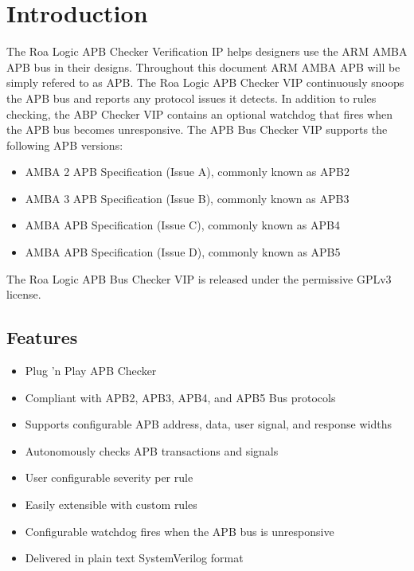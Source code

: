 \chapter{Introduction} \label{introduction}

The Roa Logic APB Checker Verification IP helps designers use the ARM\textsuperscript{\textregistered}  AMBA\textsuperscript{\textregistered}  APB\textsuperscript{\cite{ArmAPB}} bus in their designs. Throughout this document ARM\textsuperscript{\textregistered}  AMBA\textsuperscript{\textregistered}  APB will be simply refered to as APB.
The Roa Logic APB Checker VIP continuously snoops the APB bus and reports any protocol issues it detects.
In addition to rules checking, the ABP Checker VIP contains an optional watchdog that fires when the APB bus becomes unresponsive.
The APB Bus Checker VIP supports the following APB versions:
\begin{itemize}
\item
  AMBA 2 APB Specification (Issue A), commonly known as APB2
\item
  AMBA 3 APB Specification (Issue B), commonly known as APB3
\item
  AMBA APB Specification (Issue C), commonly known as APB4
\item
  AMBA APB Specification (Issue D), commonly known as APB5
\end{itemize}

The Roa Logic APB Bus Checker VIP is released under the permissive GPLv3 license.


\section{Features}\label{features}

\begin{itemize}
\item
  Plug 'n Play APB Checker
\item
  Compliant with APB2, APB3, APB4, and APB5 Bus protocols
\item
  Supports configurable APB address, data, user signal, and response widths
\item
  Autonomously checks APB transactions and signals
\item
  User configurable severity per rule
\item
  Easily extensible with custom rules
\item
  Configurable watchdog fires when the APB bus is unresponsive
\item
  Delivered in plain text SystemVerilog format
\end{itemize}


